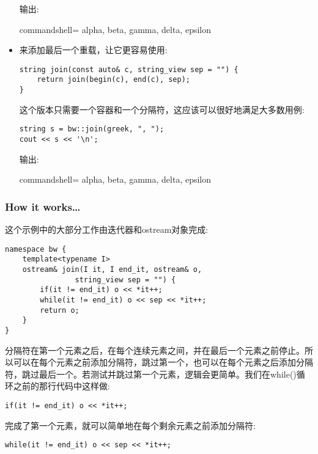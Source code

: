\begin{itemize}
输出:

\begin{tcblisting}{commandshell={}}
alpha, beta, gamma, delta, epsilon
\end{tcblisting}

\item 
来添加最后一个重载，让它更容易使用:

\begin{lstlisting}[style=styleCXX]
string join(const auto& c, string_view sep = "") {
	return join(begin(c), end(c), sep);
}
\end{lstlisting}

这个版本只需要一个容器和一个分隔符，这应该可以很好地满足大多数用例:

\begin{lstlisting}[style=styleCXX]
string s = bw::join(greek, ", ");
cout << s << '\n';
\end{lstlisting}

输出:

\begin{tcblisting}{commandshell={}}
alpha, beta, gamma, delta, epsilon
\end{tcblisting}
\end{itemize}

\subsubsection{How it works…}

这个示例中的大部分工作由迭代器和ostream对象完成:

\begin{lstlisting}[style=styleCXX]
namespace bw {
	template<typename I>
	ostream& join(I it, I end_it, ostream& o,
				string_view sep = "") {
		if(it != end_it) o << *it++;
		while(it != end_it) o << sep << *it++;
		return o;
	}
}
\end{lstlisting}

分隔符在第一个元素之后，在每个连续元素之间，并在最后一个元素之前停止。所以可以在每个元素之前添加分隔符，跳过第一个，也可以在每个元素之后添加分隔符，跳过最后一个。若测试并跳过第一个元素，逻辑会更简单。我们在while()循环之前的那行代码中这样做:

\begin{lstlisting}[style=styleCXX]
if(it != end_it) o << *it++;
\end{lstlisting}

完成了第一个元素，就可以简单地在每个剩余元素之前添加分隔符:

\begin{lstlisting}[style=styleCXX]
while(it != end_it) o << sep << *it++;
\end{lstlisting}

